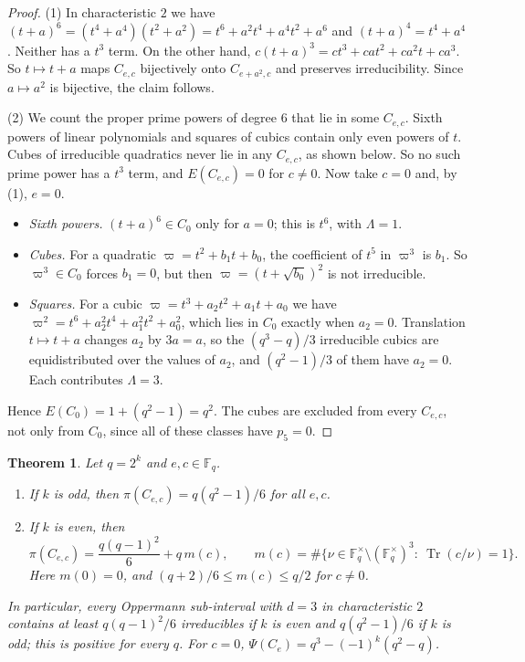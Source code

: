 \documentclass[11pt,a4paper]{amsart}
\newtheorem{theorem}{Theorem}[section]
\theoremstyle{definition}
\theoremstyle{remark}
\newcommand{\F}{\mathbb{F}}
\newcommand{\Tr}{\operatorname{Tr}}
\begin{document}
\begin{proof}
(1) In characteristic $2$ we have $(t+a)^6=(t^4+a^4)(t^2+a^2)=t^6+a^2t^4+a^4t^2+a^6$ and $(t+a)^4=t^4+a^4$. Neither has a
$t^3$ term. On the other hand, $c(t+a)^3=ct^3+cat^2+ca^2t+ca^3$. So $t\mapsto t+a$ maps $C_{e,c}$ bijectively onto
$C_{e+a^2,c}$ and preserves irreducibility. Since $a\mapsto a^2$ is bijective, the claim follows.

(2) We count the proper prime powers of degree $6$ that lie in some $C_{e,c}$. Sixth powers of linear polynomials and
squares of cubics contain only even powers of $t$. Cubes of irreducible quadratics never lie in any $C_{e,c}$, as shown
below. So no such prime power has a $t^3$ term, and $E(C_{e,c})=0$ for $c\ne0$. Now take $c=0$ and, by (1), $e=0$.
\begin{itemize}
\item \emph{Sixth powers.} $(t+a)^6\in C_0$ only for $a=0$; this is $t^6$, with $\Lambda=1$.
\item \emph{Cubes.} For a quadratic $\varpi=t^2+b_1t+b_0$, the coefficient of $t^5$ in $\varpi^3$ is $b_1$. So
$\varpi^3\in C_0$ forces $b_1=0$, but then $\varpi=(t+\sqrt{b_0})^2$ is not irreducible.
\item \emph{Squares.} For a cubic $\varpi=t^3+a_2t^2+a_1t+a_0$ we have $\varpi^2=t^6+a_2^2t^4+a_1^2t^2+a_0^2$, which lies
in $C_0$ exactly when $a_2=0$. Translation $t\mapsto t+a$ changes $a_2$ by $3a=a$, so the $(q^3-q)/3$ irreducible cubics are
equidistributed over the values of $a_2$, and $(q^2-1)/3$ of them have $a_2=0$. Each contributes $\Lambda=3$.
\end{itemize}
Hence $E(C_0)=1+(q^2-1)=q^2$. The cubes are excluded from every $C_{e,c}$, not only from $C_0$, since all of these
classes have $p_5=0$.
\end{proof}

\begin{theorem}\label{thm:p3zero}
Let $q=2^k$ and $e,c\in\F_q$.
\begin{enumerate}
\item If $k$ is odd, then $\pi(C_{e,c})=q(q^2-1)/6$ for all $e,c$.
\item If $k$ is even, then
\[
\pi(C_{e,c})=\frac{q(q-1)^2}{6}+q\,m(c),\qquad
m(c)=\#\{\nu\in\F_q^\times\setminus(\F_q^\times)^3:\ \Tr(c/\nu)=1\}.
\]
Here $m(0)=0$, and $(q+2)/6\le m(c)\le q/2$ for $c\ne0$.
\end{enumerate}
In particular, every Oppermann sub-interval with $d=3$ in characteristic $2$ contains at least $q(q-1)^2/6$
irreducibles if $k$ is even and $q(q^2-1)/6$ if $k$ is odd; this is positive for every $q$. For $c=0$,
$\Psi(C_e)=q^3-(-1)^k(q^2-q)$.
\end{theorem}
\end{document}
